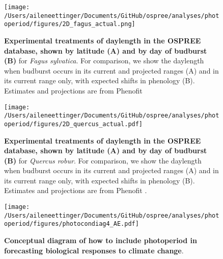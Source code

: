 \documentclass{article}
\begin{document}
 
 
\begin{figure}[p]
\texttt{[image: /Users/aileneettinger/Documents/GitHub/ospree/analyses/photoperiod/figures/2D\_fagus\_actual.png]} 
\caption{\textbf{Experimental treatments of daylength in the OSPREE database, shown by latitude (A) and by day of budburst (B)} for \textit{Fagus sylvatica}. For comparison, we show the daylength when budburst occurs in its current and projected ranges (A) and in its current range only, with expected shifts in phenology (B). Estimates and projections are from Phenofit \citep{duputie2015}}
 \label{fig:fagus}
 \end{figure}
 
\begin{figure}[p]
\texttt{[image: /Users/aileneettinger/Documents/GitHub/ospree/analyses/photoperiod/figures/2D\_quercus\_actual.pdf]} 
\caption{\textbf{Experimental treatments of daylength in the OSPREE database, shown by latitude (A) and by day of budburst (B)} for \textit{Quercus robur}. For comparison, we show the daylength when budburst occurs in its current and projected ranges (A) and in its current range only, with expected shifts in phenology (B). Estimates and projections are from Phenofit \citep{duputie2015}.}
 \label{fig:quercus}
 \end{figure}
 
\begin{figure}[p]
\texttt{[image: /Users/aileneettinger/Documents/GitHub/ospree/analyses/photoperiod/figures/photocondiag4\_AE.pdf]} 
\caption{\textbf{Conceptual diagram of how to include photoperiod in forecasting biological responses to climate change}.}
 \label{fig:condiag}
 \end{figure}

\end{document}
